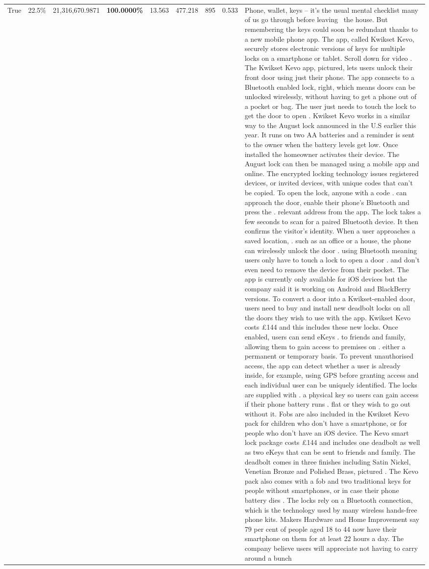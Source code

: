 \begin{table}[H]
\begin{tabular}{lllrlllll}
True & 22.5\% & 21,316,670.9871 & \bfseries \color{red} 100.0000\% & 13.563 & 477.218 & 895 & 0.533 & Phone, wallet, keys – it’s the usual mental checklist many of us go through before leaving  the house. But remembering the keys could soon be redundant thanks to a new mobile phone app. The app, called Kwikset Kevo, securely stores electronic versions of keys for multiple locks on a smartphone or tablet. Scroll down for video . The Kwikset Kevo app, pictured, lets users unlock their front door using just their phone. The app connects to a Bluetooth enabled lock, right, which means doors can be unlocked wirelessly, without having to get a phone out of a pocket or bag. The user just needs to touch the lock to get the door to open . Kwikset Kevo works in a similar way to the August lock announced in the U.S earlier this year. It runs on two AA batteries and a reminder is sent to the owner when the battery levels get low. Once installed the homeowner activates their device. The August lock can then be managed using a mobile app and online. The encrypted locking technology issues registered devices, or invited devices, with unique codes that can't be copied. To open the lock, anyone with a code . can approach the door, enable their phone's Bluetooth and press the . relevant address from the app. The lock takes a few seconds to scan for a paired Bluetooth device. It then confirms the visitor's identity. When a user approaches a saved location, . such as an office or a house, the phone can wirelessly unlock the door . using Bluetooth meaning users only have to touch a lock to open a door . and don't even need to remove the device from their pocket. The app is currently only available for iOS devices but the company said it is working on Android and BlackBerry versions. To convert a door into a Kwikset-enabled door, users need to buy and install new deadbolt locks on all the doors they wish to use with the app. Kwikset Kevo costs £144 and this includes these new locks. Once enabled, users can send eKeys . to friends and family, allowing them to gain access to premises on . either a permanent or temporary basis. To prevent unauthorised access, the app can detect whether a user is already inside, for example, using GPS before granting access and each individual user can be uniquely identified. The locks are supplied with . a physical key so users can gain access if their phone battery runs . flat or they wish to go out without it. Fobs are also included in the Kwikset Kevo pack for children who don't have a smartphone, or for people who don't have an iOS device. The Kevo smart lock package costs £144 and includes one deadbolt as well as two eKeys that can be sent to friends and family. The deadbolt comes in three finishes including Satin Nickel, Venetian Bronze and Polished Brass, pictured . The Kevo pack also comes with a fob and two traditional keys for people without smartphones, or in case their phone battery dies . The locks rely on a Bluetooth connection, which is the technology used by many wireless hands-free phone kits. Makers Hardware and Home Improvement say 79 per cent of people aged 18 to 44 now have their smartphone on them for at least 22 hours a day. The company believe users will appreciate not having to carry around a bunch 
\end{tabular}
\end{table}
